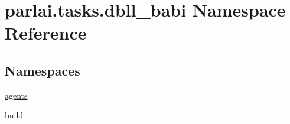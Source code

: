 \hypertarget{namespaceparlai_1_1tasks_1_1dbll__babi}{}\section{parlai.\+tasks.\+dbll\+\_\+babi Namespace Reference}
\label{namespaceparlai_1_1tasks_1_1dbll__babi}
\subsection*{Namespaces}
\begin{DoxyCompactItemize}
\item 
 \hyperlink{namespaceparlai_1_1tasks_1_1dbll__babi_1_1agents}{agents}
\item 
 \hyperlink{namespaceparlai_1_1tasks_1_1dbll__babi_1_1build}{build}
\end{DoxyCompactItemize}
